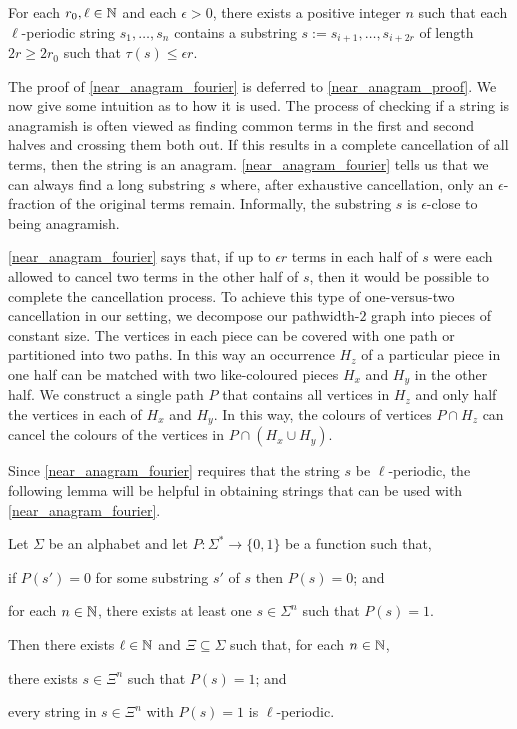 \documentclass{patmorin}
\begin{document}
\begin{lem}\label{near_anagram_fourier}
    For each $r_0,\ell\in\mathbb{N}$ and each $\epsilon>0$, there exists a positive integer $n$ such that each $\ell$-periodic string $s_1,\ldots,s_n$ contains a substring $s:=s_{i+1},\ldots,s_{i+2r}$ of length $2r \ge 2r_0$ such that $\tau(s)\le \epsilon r$.
\end{lem}

The proof of \cref{near_anagram_fourier} is deferred to \cref{near_anagram_proof}.  We now give some intuition as to how it is used.  The process of checking if a string is anagramish is often viewed as finding common terms in the first and second halves and crossing them both out.  If this results in a complete cancellation of all terms, then the string is an anagram.  \cref{near_anagram_fourier} tells us that we can always find a long substring $s$ where, after exhaustive cancellation, only an $\epsilon$-fraction of the original terms remain.  Informally, the substring $s$ is $\epsilon$-close to being anagramish.

\cref{near_anagram_fourier} says that, if up to $\epsilon r$ terms in each half of $s$ were each allowed to cancel two terms in the other half of $s$, then it would be possible to complete the cancellation process.  To achieve this type of one-versus-two cancellation in our setting, we decompose our pathwidth-$2$ graph into pieces of constant size.  The vertices in each piece can be covered with one path or partitioned into two paths.  In this way an occurrence $H_z$ of a particular piece in one half can be matched with two like-coloured pieces $H_x$ and $H_y$ in the other half. We construct a single path $P$ that contains all vertices in $H_z$ and only half the vertices in each of $H_x$ and $H_y$.  In this way, the colours of vertices $P\cap H_z$ can cancel the colours of the vertices in $P\cap(H_x\cup H_y)$.

Since \cref{near_anagram_fourier} requires that the string $s$ be $\ell$-periodic, the following lemma will be helpful in obtaining strings that can be used with \cref{near_anagram_fourier}.

\begin{lem}\label{periodicity}
    Let $\Sigma$ be an alphabet and let $P:\Sigma^*\to\{0,1\}$ be a function such that,
    \begin{compactenum}[({A}1)]
        \item if $P(s')=0$ for some substring $s'$ of $s$ then $P(s)=0$; and
        \item for each $n\in\mathbb{N}$, there exists at least one $s\in \Sigma^n$ such that $P(s)=1$.
    \end{compactenum}
    Then there exists $\ell\in\mathbb{N}$ and $\Xi\subseteq\Sigma$ such that, for each $n\in\mathbb{N}$,
    \begin{compactenum}[(C1)]
        \item there exists $s\in\Xi^n$ such that $P(s)=1$; and
        \item every string in $s\in\Xi^n$ with $P(s)=1$ is $\ell$-periodic.
    \end{compactenum}
\end{lem}
\end{document}
